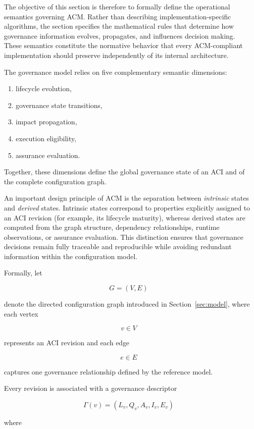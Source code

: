 \documentclass[10pt]{article}
\begin{document}
The objective of this section is therefore to formally define the operational
semantics governing ACM. Rather than describing implementation-specific
algorithms, the section specifies the mathematical rules that determine how
governance information evolves, propagates, and influences decision making.
These semantics constitute the normative behavior that every ACM-compliant
implementation should preserve independently of its internal architecture.

The governance model relies on five complementary semantic dimensions:

\begin{enumerate}
    \item lifecycle evolution,
    \item governance state transitions,
    \item impact propagation,
    \item execution eligibility,
    \item assurance evaluation.
\end{enumerate}

Together, these dimensions define the global governance state of an ACI and of
the complete configuration graph.

An important design principle of ACM is the separation between
\emph{intrinsic} states and \emph{derived} states. Intrinsic states correspond
to properties explicitly assigned to an ACI revision (for example, its
lifecycle maturity), whereas derived states are computed from the graph
structure, dependency relationships, runtime observations, or assurance
evaluation. This distinction ensures that governance decisions remain fully
traceable and reproducible while avoiding redundant information within the
configuration model.

Formally, let

\[
G=(V,E)
\]

denote the directed configuration graph introduced in Section~\ref{sec:model},
where each vertex

\[
v\in V
\]

represents an ACI revision and each edge

\[
e\in E
\]

captures one governance relationship defined by the reference model.

Every revision is associated with a governance descriptor

\[
\Gamma(v)=
(
L_v,
Q_v,
A_v,
I_v,
E_v
)
\]

where
\end{document}
